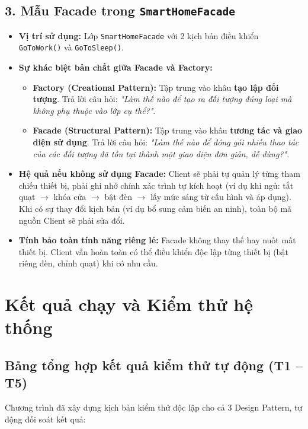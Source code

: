 \documentclass[11pt,a4paper]{article}
\begin{document}
\subsection{3. Mẫu Facade trong \texttt{SmartHomeFacade}}
\begin{itemize}[itemsep=1.2pt]
    \item \textbf{Vị trí sử dụng:} Lớp \texttt{SmartHomeFacade} với 2 kịch bản điều khiển \texttt{GoToWork()} và \texttt{GoToSleep()}.
    \item \textbf{Sự khác biệt bản chất giữa Facade và Factory:}
    \begin{itemize}[itemsep=1.0pt]
        \item \textbf{Factory (Creational Pattern):} Tập trung vào khâu \textbf{tạo lập đối tượng}. Trả lời câu hỏi: \textit{"Làm thế nào để tạo ra đối tượng đúng loại mà không phụ thuộc vào lớp cụ thể?"}.
        \item \textbf{Facade (Structural Pattern):} Tập trung vào khâu \textbf{tương tác và giao diện sử dụng}. Trả lời câu hỏi: \textit{"Làm thế nào để đóng gói nhiều thao tác của các đối tượng đã tồn tại thành một giao diện đơn giản, dễ dùng?"}.
    \end{itemize}
    \item \textbf{Hệ quả nếu không sử dụng Facade:}
    Client sẽ phải tự quản lý từng tham chiếu thiết bị, phải ghi nhớ chính xác trình tự kích hoạt (ví dụ khi ngủ: tắt quạt $\rightarrow$ khóa cửa $\rightarrow$ bật đèn $\rightarrow$ lấy mức sáng từ cấu hình và áp dụng). Khi có sự thay đổi kịch bản (ví dụ bổ sung cảm biến an ninh), toàn bộ mã nguồn Client sẽ phải sửa đổi.
    \item \textbf{Tính bảo toàn tính năng riêng lẻ:} Facade không thay thế hay nuốt mất thiết bị. Client vẫn hoàn toàn có thể điều khiển độc lập từng thiết bị (bật riêng đèn, chỉnh quạt) khi có nhu cầu.
\end{itemize}

\newpage

\section{Kết quả chạy và Kiểm thử hệ thống}

\subsection{Bảng tổng hợp kết quả kiểm thử tự động (T1 -- T5)}
Chương trình đã xây dựng kịch bản kiểm thử độc lập cho cả 3 Design Pattern, tự động đối soát kết quả:
\end{document}
